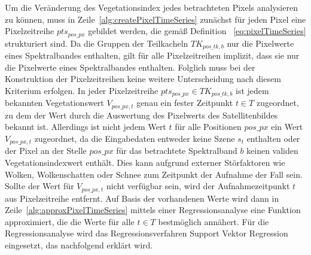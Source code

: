 Um die Veränderung des Vegetationsindex jedes betrachteten Pixels analysieren zu können, muss in Zeile~\ref{alg:createPixelTimeSeries} zunächst für jeden Pixel eine Pixelzeitreihe $pts_{pos\_px}$ gebildet werden, die gemäß Definition ~\ref{eq:pixelTimeSeries} strukturiert sind. Da die Gruppen der Teilkacheln $TK_{pos\_tk, b}$ nur die Pixelwerte eines Spektralbandes enthalten, gilt für alle Pixelzeitreihen implizit, dass sie nur die Pixelwerte eines Spektralbandes enthalten. Folglich muss bei der Konstruktion der Pixelzeitreihen keine weitere Unterscheidung nach diesem Kriterium erfolgen. In jeder Pixelzeitreihe $pts_{pos\_px} \in TK_{pos\_tk, b}$ ist jedem bekannten Vegetationswert $V_{pos\_px, t}$ genau ein fester Zeitpunkt $t \in T$ zugeordnet, zu dem der Wert durch die Auswertung des Pixelwerts des Satellitenbildes bekannt ist. Allerdings ist nicht jedem Wert $t$ für alle Positionen $pos\_px$ ein Wert $V_{pos\_px, t}$ zugeordnet, da die Eingabedaten entweder keine Szene $s_t$  enthalten oder der Pixel an der Stelle $pos\_px$ für das betrachtete Spektralband $b$ keinen validen Vegetationsindexwert enthält. Dies kann aufgrund externer Störfaktoren wie Wolken, Wolkenschatten oder Schnee zum Zeitpunkt der Aufnahme der Fall sein. Sollte der Wert für $V_{pos\_px, t}$ nicht verfügbar sein, wird der Aufnahmezeitpunkt $t$ aus Pixelzeitreihe entfernt. Auf Basis der vorhandenen Werte wird dann in Zeile~\ref{alg:approxPixelTimeSeries} mittels einer Regressionsanalyse eine Funktion approximiert, die die Werte für alle $t \in T$ bestmöglich annähert. Für die Regressionsanalyse wird das Regressionsverfahren Support Vektor Regression eingesetzt, das nachfolgend erklärt wird. \\


